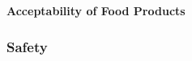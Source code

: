 \documentclass{report}
\begin{document}



\textbf{Acceptability of Food Products}
\label{sec:acceptability-products}






\subsubsection{Safety}
\label{sec:safety}

\end{document}
